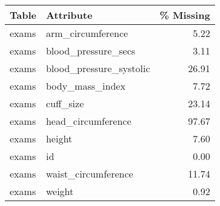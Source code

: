 \begin{tabular}{llr}
\toprule
 Table &                Attribute &  \% Missing \\
\midrule
 exams &        arm\_circumference &       5.22 \\
 exams &      blood\_pressure\_secs &       3.11 \\
 exams &  blood\_pressure\_systolic &      26.91 \\
 exams &          body\_mass\_index &       7.72 \\
 exams &                cuff\_size &      23.14 \\
 exams &       head\_circumference &      97.67 \\
 exams &                   height &       7.60 \\
 exams &                       id &       0.00 \\
 exams &      waist\_circumference &      11.74 \\
 exams &                   weight &       0.92 \\
\bottomrule
\end{tabular}
